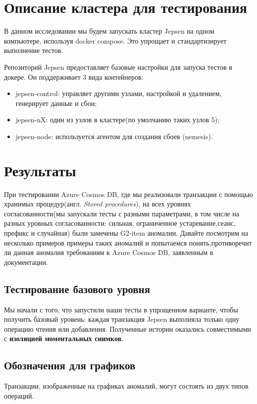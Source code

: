\documentclass[12pt,  openany]{book}
\begin{document}
\section{Описание кластера для тестирования}
В данном исследовании мы будем запускать кластер Jepsen на одном компьютере, используя docker compose.  Это упрощает и стандартизирует выполнение тестов. 
\par Репозиторий Jepsen предоставляет базовые настройки для запуска тестов в докере. Он поддерживает 3 вида контейнеров:  
\begin{itemize}
\item jepsen-control:  управляет другими узлами, настройкой и удалением, генерирует данные и сбои;
\item jepsen-nX:  один из узлов в кластере(по умолчанию таких узлов 5);
\item jepsen-node: используется агентом для создания сбоев (nemesis). 
\end{itemize}

\section{Результаты}
При тестировании Azure Cosmos DB, где мы реализовали транзакции с помощью хранимых процедур(англ. \textit{Stored procedures}), на всех уровнях согласованности(мы запускали тесты с разными параметрами, в том числе на разных уровных согласованности: сильная, ограниченное устаревание,сеанс, префикс и случайная) были замечены G2-item  аномалии. Давайте посмотрим на несколько примеров примеры таких аномалий и попытаемся понять,противоречит ли данная аномалия требованиям к Azure Cosmos DB, заявленным в документации.
\subsection{Тестирование базового уровня}
Мы начали с того, что запустили наши тесты в упрощенном варианте, чтобы получить базовый уровень: каждая транзакция Jepsen выполняла только одну операцию чтения или добавления.
Полученные истории оказались совместимыми с \textbf{изоляцией моментальных снимков}.

\subsection{Обозначения для графиков}
Транзакции, изображенные на графиках аномалий, могут состоять из двух типов операций.
\end{document}
